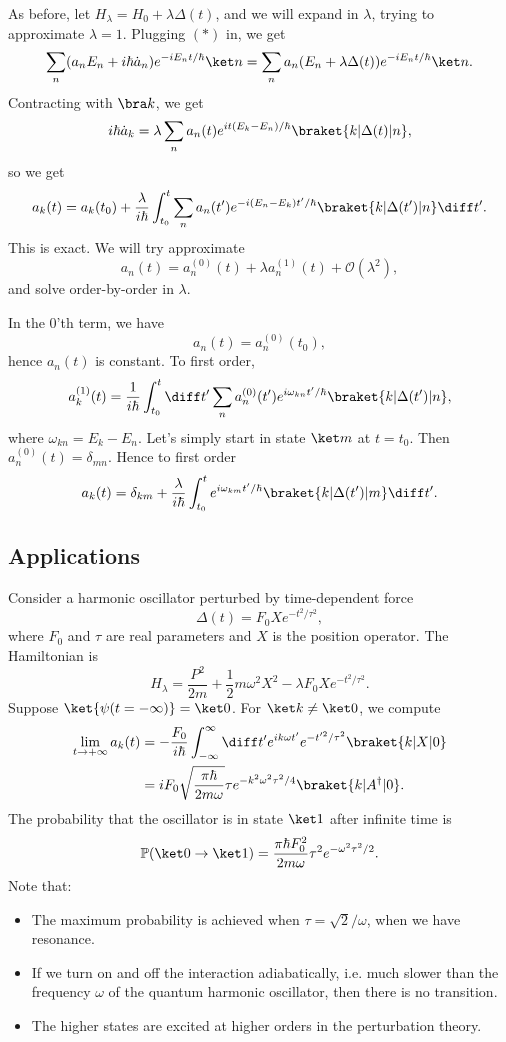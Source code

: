 \documentclass[12pt]{article}
\begin{document}
As before, let $H_\lambda = H_0 + \lambda \Delta(t)$, and we will expand in  $\lambda$, trying to approximate $\lambda = 1$. Plugging $(\ast)$ in, we get
 \[
\sum_n (a_n E_n + i \hbar \dot a_n) e^{-i E_n t/\hbar} \ket n = \sum_n a_n (E_n + \lambda \Delta (t)) e^{-i E_n t/\hbar} \ket n.
\]
Contracting with $\bra k$, we get
\[
	i \hbar \dot a_k = \lambda \sum_n a_n(t) e^{i t (E_k - E_n)/\hbar} \braket{k|\Delta(t)|n},
\]
so we get
\[
	a_k(t) = a_k(t_0) + \frac{\lambda}{i \hbar} \int_{t_0}^{t} \sum_n a_n(t') e^{-i (E_n - E_k)t'/\hbar} \braket{k|\Delta(t')|n} \diff t'.
\]
This is exact. We will try approximate
\[
a_n(t) = a_n^{(0)}(t) + \lambda a_n^{(1)}(t) + \mathcal{O}(\lambda^2),
\]
and solve order-by-order in $\lambda$.

In the $0$'th term, we have
\[
a_n(t) = a_n^{(0)}(t_0),
\]
hence $a_n(t)$ is constant. To first order,
\[
	a_k^{(1)}(t) = \frac{1}{i \hbar} \int_{t_0}^t \diff t' \sum_n a_n^{(0)}(t') e^{i \omega_{kn} t'/\hbar} \braket{k|\Delta(t')|n},
\]
where $\omega_{kn} = E_k - E_n$. Let's simply start in state $\ket m$ at $t = t_0$. Then $a_n^{(0)}(t) = \delta_{mn}$. Hence to first order
\[
	a_k(t) = \delta_{km} + \frac{\lambda}{i \hbar} \int_{t_0}^t e^{i \omega_{km} t'/\hbar} \braket{k|\Delta(t')|m} \diff t'.
\]

\subsection{Applications}
\label{sub:app_time_pt}

\begin{exbox}
	Consider a harmonic oscillator perturbed by time-dependent force
	\[
	\Delta(t) = F_0 X e^{-t^2/\tau^2},
	\]
	where $F_0$ and $\tau$ are real parameters and $X$ is the position operator. The Hamiltonian is
	\[
	H_\lambda = \frac{P^2}{2m} + \frac{1}{2} m \omega^2 X^2 - \lambda F_0 X e^{-t^2/\tau^2}.
	\]
	Suppose $\ket{\psi(t = -\infty)} = \ket 0$. For $\ket k \neq \ket 0$, we compute
	\begin{align*}
		\lim_{t \to +\infty} a_k(t) &= - \frac{F_0}{i \hbar} \int_{-\infty}^{\infty} \diff t' e^{i k \omega t'} e^{-t'^2/\tau^2} \braket{k|X|0} \\
					    &= i F_0 \sqrt{\frac{\pi \hbar}{2 m \omega}} \tau e^{-k^2 \omega^2 \tau^2/4} \braket{k|A^{\dagger}|0}.
	\end{align*}
	The probability that the oscillator is in state $\ket 1$ after infinite time is
	\[
	\mathbb{P}(\ket 0 \to \ket 1) = \frac{\pi \hbar F_0^2}{2 m \omega} \tau^2 e^{-\omega^2 \tau^2/2}.
	\]
	Note that:
\begin{itemize}
	\item The maximum probability is achieved when $\tau = \sqrt 2 / \omega$, when we have resonance.
	\item If we turn on and off the interaction adiabatically, i.e. much slower than the frequency $\omega$ of the quantum harmonic oscillator, then there is no transition.
	\item The higher states are excited at higher orders in the perturbation theory.
\end{itemize}
\end{exbox}
\end{document}

